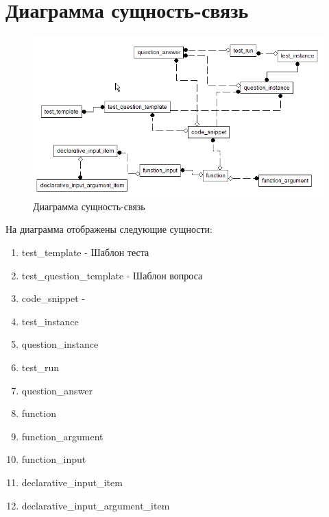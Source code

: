\documentclass{article}
\begin{document}
\section{Диаграмма сущность-связь}
\begin{figure}[H]
    \includegraphics[width=\textwidth, center]{conceptual.png}
    \caption{Диаграмма сущность-связь}
\end{figure}
На диаграмма отображены следующие сущности:
\begin{enumerate}
    \item test\_template - Шаблон теста
    \item test\_question\_template - Шаблон вопроса
    \item code\_snippet - 
    \item test\_instance
    \item question\_instance
    \item test\_run
    \item question\_answer
    \item function
    \item function\_argument
    \item function\_input
    \item declarative\_input\_item
    \item declarative\_input\_argument\_item
\end{enumerate}
\end{document}
